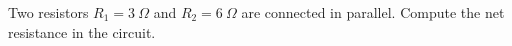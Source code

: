 Two resistors $R_1 = 3 \ \Omega$ and $R_2 = 6 \ \Omega$
are connected in parallel. 
Compute the net resistance in the circuit.